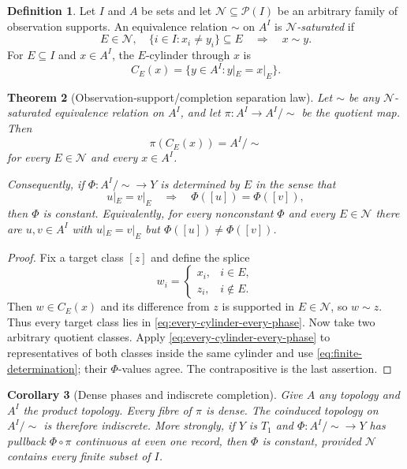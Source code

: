 \documentclass[11pt]{article}
\newtheorem{theorem}{Theorem}[section]
\newtheorem{corollary}[theorem]{Corollary}
\theoremstyle{definition}
\newtheorem{definition}[theorem]{Definition}
\theoremstyle{remark}
\begin{document}
\begin{definition}
Let $I$ and $A$ be sets and let $\mathcal N\subseteq\mathcal P(I)$ be an arbitrary family of
observation supports.  An equivalence relation $\sim$ on $A^I$ is
\emph{$\mathcal N$-saturated} if
\[
 E\in\mathcal N,\quad \{i\in I:x_i\ne y_i\}\subseteq E
 \quad\Longrightarrow\quad x\sim y.
\]
For $E\subseteq I$ and $x\in A^I$, the $E$-cylinder through $x$ is
\[
 C_E(x)=\{y\in A^I:y|_E=x|_E\}.
\]
\end{definition}

\begin{theorem}[Observation-support/completion separation law]
\label{thm:finite-completion-separation}
Let $\sim$ be any $\mathcal N$-saturated equivalence relation on $A^I$, and let
$\pi:A^I\to A^I/{\sim}$ be the quotient map.  Then
\[
 \pi(C_E(x))=A^I/{\sim}
 \tag{2.1}\label{eq:every-cylinder-every-phase}
\]
for every $E\in\mathcal N$ and every $x\in A^I$.

Consequently, if $\Phi:A^I/{\sim}\to Y$ is determined by $E$ in the sense that
\[
 u|_E=v|_E\quad\Longrightarrow\quad \Phi([u])=\Phi([v]),
 \tag{2.2}\label{eq:finite-determination}
\]
then $\Phi$ is constant.  Equivalently, for every nonconstant $\Phi$ and every $E\in\mathcal N$
there are $u,v\in A^I$ with $u|_E=v|_E$ but $\Phi([u])\ne\Phi([v])$.
\end{theorem}

\begin{proof}
Fix a target class $[z]$ and define the splice
\[
 w_i=\begin{cases}x_i,&i\in E,\\ z_i,&i\notin E.\end{cases}
\]
Then $w\in C_E(x)$ and its difference from $z$ is supported in $E\in\mathcal N$, so $w\sim z$.
Thus every target class
lies in \eqref{eq:every-cylinder-every-phase}.  Now take two arbitrary quotient classes.  Apply
\eqref{eq:every-cylinder-every-phase} to representatives of both classes inside the same
cylinder and use \eqref{eq:finite-determination}; their $\Phi$-values agree.  The contrapositive
is the last assertion.
\end{proof}

\begin{corollary}[Dense phases and indiscrete completion]
\label{cor:dense-completion-phases}
Give $A$ any topology and $A^I$ the product topology.  Every fibre of $\pi$ is dense.  The
coinduced topology on $A^I/{\sim}$ is therefore indiscrete.  More strongly, if $Y$ is $T_1$ and
$\Phi:A^I/{\sim}\to Y$ has pullback $\Phi\circ\pi$ continuous at even one record, then $\Phi$ is
constant, provided $\mathcal N$ contains every finite subset of $I$.
\end{corollary}
\end{document}
